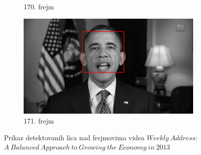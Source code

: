 \documentclass[a4paper, openany, oneside, 11pt]{book}
\begin{document}
\begin{figure}[!h]
\begin{subfigure}{0.475\textwidth}
            \caption{170. frejm}
            \label{fig:2_3c}
            \vspace{0pt}
        \end{subfigure}%
        \begin{subfigure}{0.475\textwidth}
            \centering
            \includegraphics[scale=0.21]{res/171.jpg}
            \caption{171. frejm}
            \label{fig:2_3d}
            \vspace{0pt}
        \end{subfigure}
        \caption{Prikaz detektovanih lica nad frejmovima videa $Weekly\ Address$: $A\ Balanced\ Approach\ to\ Growing\ the\ Economy\ in\ 2013$}
        \label{fig:2_3}
\end{figure}
\end{document}

